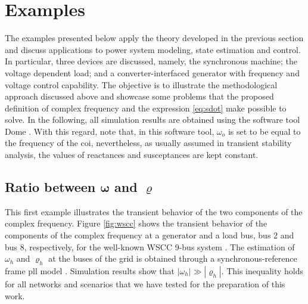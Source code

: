 \documentclass[journal, twocolumn, letter]{IEEEtran}
\newcommand{\bfg}[1]{\boldsymbol{#1}}
\newcommand{\rhoh}{\varrho_h}
\newcommand{\wh}{\omega_h}
\newcommand{\wo}{\omega_o}
\newcommand{\rhovec}{\bfg \varrho}
\newcommand{\wvec}{\bfg \omega}
\begin{document}
\section{Examples}
\label{sec:modeling}

The examples presented below apply the theory developed in the
previous section and discuss applications to power system modeling,
state estimation and control.  In particular, three devices are
discussed, namely, the synchronous machine; the voltage dependent
load; and a converter-interfaced generator with frequency and voltage
control capability.  The objective is to illustrate the methodological
approach discussed above and showcase some problems that the proposed
definition of complex frequency and the expression \eqref{eq:sdot}
make possible to solve.  In the following, all simulation results are
obtained using the software tool Dome \cite{Dome}.   With
this regard, note that, in this software tool, $\wo$ is set to be
equal to the frequency of the \ac{coi}, nevertheless, as usually
assumed in transient stability analysis, the values of reactances and
susceptances are kept constant.  





\subsection{Ratio between $\wvec$ and $\rhovec$}
\label{sub:ratio}

This first example illustrates the transient behavior of the two
components of the complex frequency.  Figure \ref{fig:wscc} shows the
transient behavior of the components of the complex frequency at a
generator and a load bus, bus 2 and bus 8, respectively, for the
well-known WSCC 9-bus system \cite{Sauer:1998}.  The estimation of
$\wh$ and $\rhoh$ at the buses of the grid is obtained through a
synchronous-reference frame \ac{pll} model \cite{Ortega:2018}.
Simulation results show that $|\wh| \gg |\rhoh|$.
This inequality holds for all networks and scenarios that we have
tested for the preparation of this work.
\end{document}
